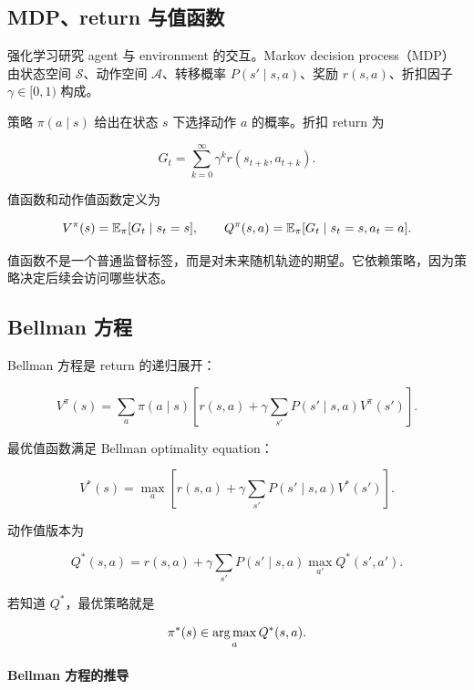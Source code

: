 \documentclass[11pt]{ctexart}
\begin{document}

\subsection{MDP、return 与值函数}


强化学习研究 agent 与 environment 的交互。Markov decision process（MDP）由状态空间 \(\mathcal{S}\)、动作空间 \(\mathcal{A}\)、转移概率 \(P(s'\mid s,a)\)、奖励 \(r(s,a)\)、折扣因子 \(\gamma\in[0,1)\) 构成。

策略 \(\pi(a\mid s)\) 给出在状态 \(s\) 下选择动作 \(a\) 的概率。折扣 return 为

\[
  G_t=\sum_{k=0}^{\infty}\gamma^k r(s_{t+k},a_{t+k}).
\]

\begin{definition}[值函数与动作值函数]
值函数和动作值函数定义为

\[
  V^\pi(s)=\mathbb{E}_\pi[G_t\mid s_t=s],
  \qquad
  Q^\pi(s,a)=\mathbb{E}_\pi[G_t\mid s_t=s,a_t=a].
\]
\end{definition}

值函数不是一个普通监督标签，而是对未来随机轨迹的期望。它依赖策略，因为策略决定后续会访问哪些状态。

\subsection{Bellman 方程}


Bellman 方程是 return 的递归展开：

\[
  V^\pi(s)
  =
  \sum_a\pi(a\mid s)
  \left[
    r(s,a)
    +
    \gamma
    \sum_{s'}P(s'\mid s,a)V^\pi(s')
  \right].
\]

最优值函数满足 Bellman optimality equation：

\[
  V^*(s)
  =
  \max_{a}
  \left[
    r(s,a)
    +
    \gamma
    \sum_{s'}P(s'\mid s,a)V^*(s')
  \right].
\]

动作值版本为

\[
  Q^*(s,a)
  =
  r(s,a)
  +
  \gamma
  \sum_{s'}P(s'\mid s,a)
  \max_{a'}Q^*(s',a').
\]

若知道 \(Q^*\)，最优策略就是

\[
  \pi^*(s)\in\operatorname*{arg\,max}_a Q^*(s,a).
\]

\paragraph{Bellman 方程的推导}
\end{document}
